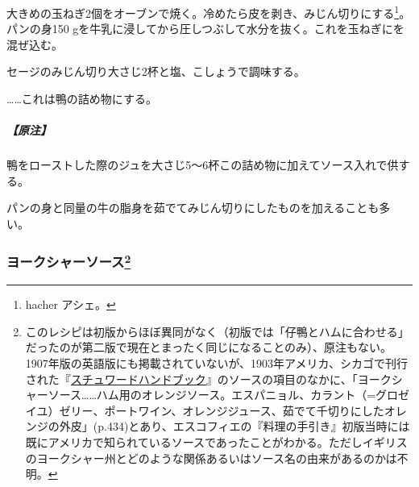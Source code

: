 \begin{recette}

大きめの玉ねぎ2個をオーブンで焼く。冷めたら皮を剥き、みじん切りにする\footnote{hacher
  アシェ。}。パンの身150
gを牛乳に浸してから圧しつぶして水分を抜く。これを玉ねぎにを混ぜ込む。

セージのみじん切り大さじ2杯と塩、こしょうで調味する。

\ldots{}\ldots{}これは鴨の詰め物にする。

\hypertarget{ux539fux6ce8-3}{%
\subparagraph{【原注】}\label{ux539fux6ce8-3}}

鴨をローストした際のジュを大さじ5〜6杯この詰め物に加えてソース入れで供する。

パンの身と同量の牛の脂身を茹でてみじん切りにしたものを加えることも多い。

\maeaki

\hypertarget{ux30e8ux30fcux30afux30b7ux30e3ux30fcux30bdux30fcux30b953}{%
\subsubsection[ヨークシャーソース]{\texorpdfstring{ヨークシャーソース\footnote{このレシピは初版からほぼ異同がなく（初版では「仔鴨とハムに合わせる」だったのが第二版で現在とまったく同じになることのみ）、原注もない。1907年版の英語版にも掲載されていないが、1903年アメリカ、シカゴで刊行された『\href{https://archive.org/details/stewardshandbook00whitiala}{スチュワードハンドブック}』のソースの項目のなかに、「ヨークシャーソース\ldots{}\ldots{}ハム用のオレンジソース。エスパニョル、カラント（=グロゼイユ）ゼリー、ポートワイン、オレンジジュース、茹でて千切りにしたオレンジの外皮」(p.434)とあり、エスコフィエの『料理の手引き』初版当時には既にアメリカで知られているソースであったことがわかる。ただしイギリスのヨークシャー州とどのような関係あるいはソース名の由来があるのかは不明。}}{ヨークシャーソース}}\label{ux30e8ux30fcux30afux30b7ux30e3ux30fcux30bdux30fcux30b953}}


\end{recette}
